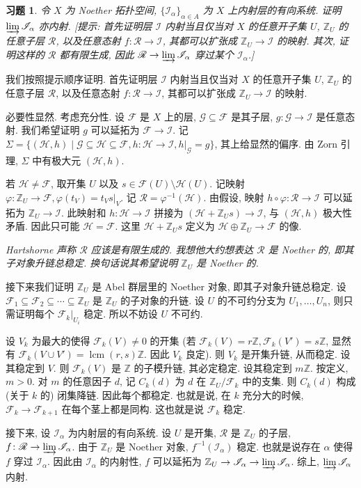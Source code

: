 \documentclass{article}
\theoremstyle{exercise}
\newtheorem{exercise}{习题}[section]
\theoremstyle{plain}
\theoremstyle{remark}
\newenvironment{proofc}{\proof}{\endproof}
\def\Z{\mathbb{Z}}
\def\cF{\mathscr{F}}
\def\cG{\mathscr{G}}
\def\cH{\mathscr{H}}
\def\cI{\mathscr{I}}
\def\cR{\mathscr{R}}
\begin{document}
\begin{exercise}
  令 $X$ 为 Noether 拓扑空间, $\{\cI_\alpha\}_{\alpha \in A}$ 为 $X$ 上内射层的有向系统. 证明 $\varinjlim \cI_\alpha$ 亦内射.
  [\emph{提示:} 首先证明层 $\cI$ 内射当且仅当对 $X$ 的任意开子集 $U$, $\Z_U$ 的任意子层 $\cR$, 以及任意态射 $f \colon \cR \to \cI$,
  其都可以扩张成 $\Z_U \to \cI$ 的映射.
  其次, 证明这样的 $\cR$ 都有限生成, 因此 $\cR \to \varinjlim \cI_\alpha$ 穿过某个 $\cI_\alpha$.]
\end{exercise}

\begin{proofc}
  我们按照提示顺序证明. 首先证明层 $\cI$ 内射当且仅当对 $X$ 的任意开子集 $U$, $\Z_U$ 的任意子层 $\cR$, 以及任意态射 $f \colon \cR \to \cI$,
  其都可以扩张成 $\Z_U \to \cI$ 的映射.

  必要性显然. 考虑充分性. 设 $\cF$ 是 $X$ 上的层, $\cG \subseteq \cF$ 是其子层, $g \colon \cG \to \cI$ 是任意态射.
  我们希望证明 $g$ 可以延拓为 $\cF \to \cI$.
  记 $\Sigma = \{ (\cH, h) \mid \cG \subseteq \cH \subseteq \cF, h \colon \cH \to \cI, h|_{\cG} = g \}$,
  其上给显然的偏序. 由 Zorn 引理, $\Sigma$ 中有极大元 $(\cH, h)$.

  若 $\cH \neq \cF$, 取开集 $U$ 以及 $s \in \cF(U) \setminus \cH(U)$.
  记映射 $\varphi \colon \Z_U \to \cF, \varphi(t_V) = t_Vs|_V$. 记 $\cR = \varphi^{-1}(\cH)$.
  由假设, 映射 $h \circ \varphi \colon \cR \to \cI$ 可以延拓为 $\Z_U \to \cI$.
  此映射和 $h \colon \cH \to \cI$ 拼接为 $(\cH + \Z_Us) \to \cI$, 与 $(\cH, h)$ 极大性矛盾. 因此只可能 $\cH = \cF$.
  这里 $\cH + \Z_Us$ 定义为 $\cH \oplus \Z_U \to \cF$ 的像.

  \emph{Hartshorne 声称 $\cR$ 应该是有限生成的. 我想他大约想表达 $\cR$ 是 Noether 的, 即其子对象升链总稳定. 换句话说其希望说明 $\Z_U$ 是 Noether 的.}

  接下来我们证明 $\Z_U$ 是 Abel 群层里的 Noether 对象, 即其子对象升链总稳定.
  设 $\cF_1 \subseteq \cF_2 \subseteq \cdots \subseteq \Z_U$ 是 $\Z_U$ 的子对象的升链.
  设 $U$ 的不可约分支为 $U_1, \dots, U_n$, 则只需证明每个 $\cF_k|_{U_i}$ 稳定. 所以不妨设 $U$ 不可约.

  设 $V_k$ 为最大的使得 $\cF_k(V) \neq 0$ 的开集 (若 $\cF_k(V) = r\Z, \cF_k(V') = s\Z$, 显然有 $\cF_k(V \cup V') = \operatorname{lcm}(r, s)\Z$. 因此 $V_k$ 良定).
  则 $V_k$ 是开集升链, 从而稳定. 设其稳定到 $V$.
  则 $\cF_k(V)$ 是 $\Z$ 的子模升链, 其必定稳定.
  设其稳定到 $m\Z$. 按定义, $m > 0$.
  对 $m$ 的任意因子 $d$, 记 $C_k(d)$ 为 $d$ 在 $\Z_U / \cF_k$ 中的支集. 则 $C_k(d)$ 构成 (关于 $k$ 的) 闭集降链.
  因此每个都稳定. 也就是说, 在 $k$ 充分大的时候, $\cF_k \to \cF_{k+1}$ 在每个茎上都是同构. 这也就是说 $\cF_k$ 稳定.

  接下来, 设 $\cI_\alpha$ 为内射层的有向系统. 设 $U$ 是开集, $\cR$ 是 $\Z_U$ 的子层, $f \colon \cR \to \varinjlim \cI_\alpha$.
  由于 $\Z_U$ 是 Noether 对象, $f^{-1}(\cI_\alpha)$ 稳定. 也就是说存在 $\alpha$ 使得 $f$ 穿过 $\cI_\alpha$.
  因此由 $\cI_\alpha$ 的内射性, $f$ 可以延拓为 $\Z_U \to \cI_\alpha \to \varinjlim \cI_\alpha$. 综上, $\varinjlim \cI_\alpha$ 内射.
\end{proofc}
\end{document}
